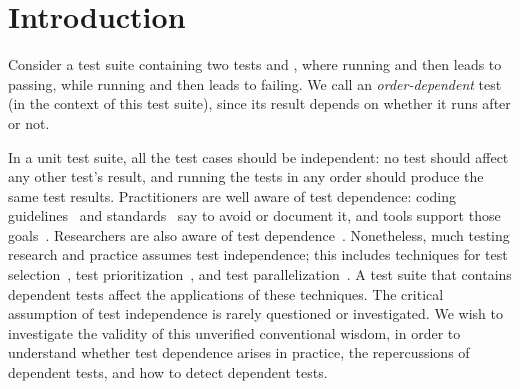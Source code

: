 \section{Introduction}


Consider a test suite containing two tests 
and , where running  and then  leads
to  passing, while running  and then
 leads to  failing. We call 
an \textit{order-dependent} test (in the context of this test suite), since its result depends on
whether it runs after  or not.



In a unit test suite, all the test cases should be independent:
no test should affect any other test's result, and
running the tests in any order should produce the same test results.
Practitioners are well aware of test dependence:  coding
guidelines~\cite{unit-test-def,Massol:2003} and
standards~\cite{IEEE:829-1998,IEEE:829-2008} say to avoid or document it,
and tools support those goals~\cite{junitordering,depunit,testng, easymock, randomjunit}.
Researchers are also aware of test
dependence~\cite{Csallner:2004, Steimann:2013, Gray:1994:QGB:191843.191886,Chays:2000:FTD:347324.348954,kapfhammeretal:FSE:2003,Wang:2007:AGC, Samimi:2013:DM}.
Nonetheless, much testing research and practice
assumes test independence;
this includes techniques for test selection~\cite{harroldetal:OOPSLA:2001,RenCR2006},
test prioritization~\cite{Elbaum:2000:PTC:347324.348910},
and test parallelization~\cite{Misailovic:2007}.
A test suite that contains dependent tests affect the applications
of these techniques.
The critical assumption of test independence is rarely questioned or investigated.
We wish to investigate the validity of this unverified conventional wisdom,
in order to understand whether test dependence arises in practice, 
the repercussions of dependent tests, and how to 
detect dependent tests.

